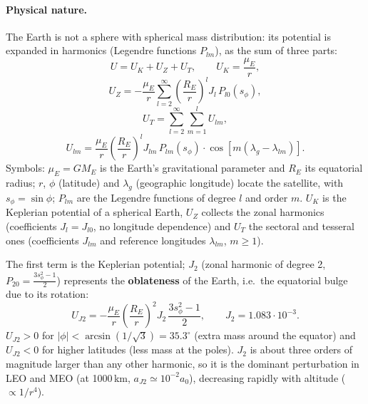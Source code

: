 \paragraph{Physical nature.} The Earth is not a sphere with spherical mass distribution: its potential is expanded in harmonics
(Legendre functions $P_{lm}$), as the sum of three parts:
\begin{equation}
U=U_K+U_Z+U_T,\qquad U_K=\frac{\mu_E}{r},
\end{equation}
\begin{equation}
U_Z=-\frac{\mu_E}{r}\sum_{l=2}^{\infty}\left(\frac{R_E}{r}\right)^{l}J_l\,P_{l0}(s_\phi),
\end{equation}
\begin{equation}
U_T=\sum_{l=2}^{\infty}\sum_{m=1}^{l}U_{lm},
\end{equation}
\begin{equation}
U_{lm}=\frac{\mu_E}{r}\left(\frac{R_E}{r}\right)^{l}J_{lm}\,P_{lm}(s_\phi)\cdot\cos\!\left[m(\lambda_g-\lambda_{lm})\right].
\end{equation}
Symbols: $\mu_E=GM_E$ is the Earth's gravitational parameter and $R_E$ its equatorial radius; $r$, $\phi$ (latitude) and $\lambda_g$
(geographic longitude) locate the satellite, with $s_\phi=\sin\phi$; $P_{lm}$ are the Legendre functions of degree $l$ and order $m$.
$U_K$ is the Keplerian potential of a spherical Earth, $U_Z$ collects the zonal harmonics (coefficients $J_l=J_{l0}$, no longitude
dependence) and $U_T$ the sectoral and tesseral ones (coefficients $J_{lm}$ and reference longitudes $\lambda_{lm}$, $m\ge1$).

The first term is the Keplerian potential; $J_2$ (zonal harmonic of degree 2, $P_{20}=\frac{3s_\phi^2-1}{2}$) represents the
\textbf{oblateness} of the Earth, i.e.\ the equatorial bulge due to its rotation:
\begin{equation}
U_{J2}=-\frac{\mu_{E}}{r}\left(\frac{R_{E}}{r}\right)^{2}J_{2}\,\frac{3s_{\phi}^{2}-1}{2},\qquad J_2=1.083\cdot10^{-3}.
\end{equation}
$U_{J2}>0$ for $|\phi|<\arcsin(1/\sqrt3)=35.3^\circ$ (extra mass around the equator) and $U_{J2}<0$ for higher latitudes (less mass at
the poles). $J_2$ is about three orders of magnitude larger than any other harmonic, so it is the dominant perturbation in LEO and
MEO (at 1000\,km, $a_{J2}\simeq10^{-2}a_0$), decreasing rapidly with altitude ($\propto1/r^4$).

